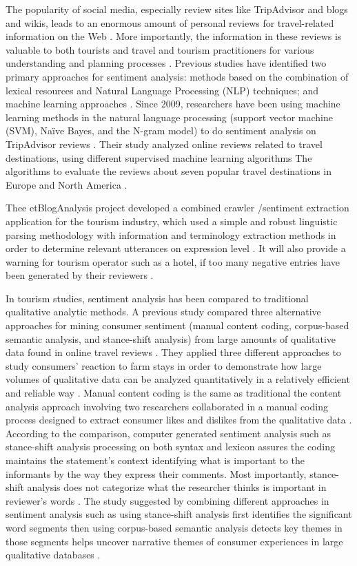 The popularity of social media, especially review sites like TripAdvisor and blogs and wikis, leads to an enormous amount of personal reviews for travel-related information on the Web \cite{opinion2014}. More importantly, the information in these reviews is valuable to both tourists and travel and tourism practitioners for various understanding and planning processes \cite{YE20096527}. Previous studies have identified two primary approaches for sentiment analysis: methods based on the combination of lexical resources and Natural Language Processing (NLP) techniques; and machine learning approaches \cite{Garcia2012}. Since 2009, researchers have been using machine learning methods in the natural language processing (support vector machine (SVM), Naïve Bayes, and the N-gram model) to do sentiment analysis on TripAdvisor reviews \cite{YE20096527}. 
Their study analyzed online reviews related to travel destinations, using different supervised machine learning algorithms The
algorithms to evaluate the reviews about seven popular travel destinations in Europe and North America \cite{YE20096527}.

Thee etBlogAnalysis project developed a combined crawler /sentiment extraction application for the tourism industry, which used a simple and robust linguistic parsing methodology with information and terminology extraction methods in order to determine relevant utterances on expression level \cite{opinion2014}. It will also provide a warning for tourism operator such as a hotel, if too many negative entries have been generated by their reviewers \cite{Garcia2012}.

In tourism studies, sentiment analysis has been compared to traditional qualitative analytic methods. A previous study compared three alternative approaches for mining consumer sentiment (manual content coding, corpus-based semantic analysis, and stance-shift analysis) from large amounts of qualitative data found in online travel reviews \cite{Farm}. They applied three different approaches to study consumers' reaction to farm stays in order to demonstrate how large volumes of qualitative data can be analyzed quantitatively in a relatively efficient and reliable way \cite{Farm}.  Manual content coding is the same as traditional the content analysis approach involving two researchers collaborated in a manual coding process designed to extract consumer likes and dislikes from the qualitative data \cite{Farm}. According to the comparison, computer generated sentiment analysis such as stance-shift analysis processing on both syntax and lexicon assures the coding maintains the statement's context identifying what is important to the informants by the way they express their comments. Most importantly, stance-shift analysis does not categorize what the researcher thinks is important in reviewer's words \cite{Farm}. The study suggested by combining different approaches in sentiment analysis such as using stance-shift analysis first identifies the significant word segments then using corpus-based semantic analysis detects key themes in those segments helps uncover narrative themes of consumer experiences in large qualitative databases \cite{Farm}.

